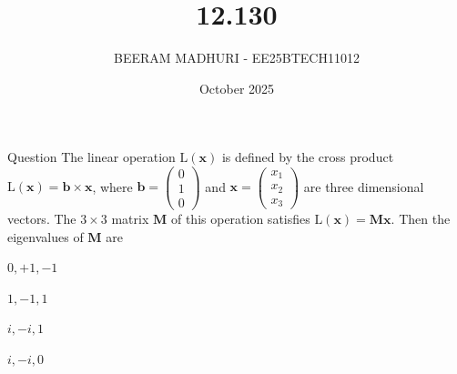 \documentclass{beamer}
\title %
{12.130}
\date{October  2025}
\author %
{BEERAM MADHURI - EE25BTECH11012}
\begin{document}
\frame{\titlepage}
\begin{frame}{Question}
The linear operation $\mathrm{L}(\mathbf{x})$ is defined by the cross product $\mathrm{L}(\mathbf{x}) = \mathbf{b} \times \mathbf{x}$, where $\mathbf{b} = 
\begin{pmatrix}
0 \\
1 \\
0
\end{pmatrix}$ and $\mathbf{x} = \begin{pmatrix}
x_1 \\
x_2 \\
x_3
\end{pmatrix}$ are three dimensional vectors. The $3 \times 3$ matrix $\mathbf{M}$ of this operation satisfies $\mathrm{L}(\mathbf{x}) = \mathbf{M}\mathbf{x}$. Then the eigenvalues of $\mathbf{M}$ are

\begin{enumerate}[label=(\alph*)]
\begin{multicols}{2}
    \item $0, +1, -1$
    \item $1, -1, 1$
    \item $i, -i, 1$
    \item $i, -i, 0$
    \end{multicols}
\end{enumerate}
\end{frame}
\end{document}
